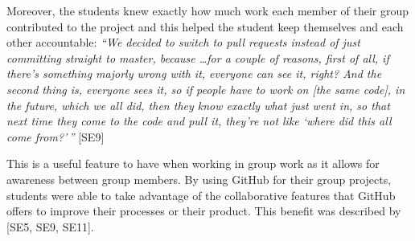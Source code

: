 
Moreover, the students knew exactly how much work each member of their group contributed to the project and this helped the student keep themselves and each other accountable: \textit{``We decided to switch to pull requests instead of just committing straight to master, because \ldots for a couple of reasons, first of all, if there's something majorly wrong with it, everyone can see it, right? And the second thing is, everyone sees it, so if people have to work on [the same code], in the future, which we all did, then they know exactly what just went in, so that next time they come to the code and pull it, they're not like `where did this all come from?'\,''} [SE9]

This is a useful feature to have when working in group work as it allows for awareness between group members. By using GitHub for their group projects, students were able to take advantage of the collaborative features that GitHub offers to improve their processes or their product. This benefit was described by [SE5, SE9, SE11]. \\







